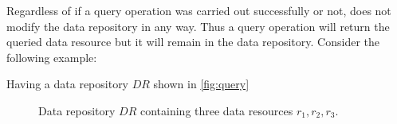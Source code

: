 Regardless of if a query operation was carried out successfully or not, does not modify the data repository in any way. Thus a query operation will return the queried data resource but it will remain in the data repository. Consider the following example:

\begin{example}
Having a data repository $DR$ shown in \autoref{fig:query}
\begin{figure}[!ht]
    \begin{center}
        
        \caption{Data repository $DR$ containing three data resources $r_1, r_2, r_3$.}
        \label{fig:query}
    \end{center}
\end{figure}
\end{example}